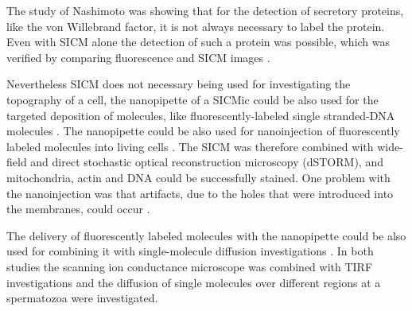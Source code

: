 The study of Nashimoto was showing that for the detection of secretory proteins, like the von 
Willebrand factor, it is not always necessary to label the protein. Even with SICM alone the 
detection of such a protein was possible, which was verified by comparing fluorescence and SICM 
images \cite{Nashimoto2015}.

Nevertheless SICM does not necessary being used for investigating the topography of a cell, 
the nanopipette of a SICMic could be also used for the targeted deposition of molecules, like 
fluorescently-labeled single stranded-DNA molecules \cite{Ying2002,Hennig2015}. The nanopipette 
could be also used for nanoinjection of fluorescently labeled molecules into living cells 
\cite{Hennig2015_nanoinj}. The SICM was therefore combined with wide-field and direct stochastic 
optical reconstruction microscopy (dSTORM), and mitochondria, actin and DNA could be successfully 
stained. One problem with the nanoinjection was that artifacts, due to the holes that were 
introduced into the membranes, could occur \cite{Hennig2015_nanoinj}.

The delivery of fluorescently labeled molecules with the nanopipette could be also used for 
combining it with single-molecule diffusion investigations \cite{Bruckbauer2007, Bruckbauer2010}. 
In both studies the scanning ion conductance microscope was combined with TIRF investigations and 
the diffusion of single molecules over different regions at a spermatozoa were investigated. 

